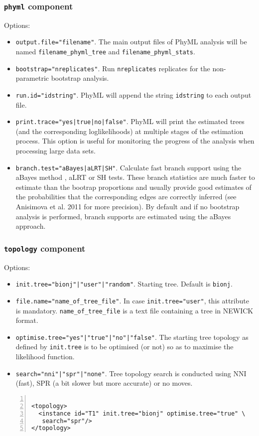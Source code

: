 \documentclass[a4paper,12pt]{article}
\newcommand{\x}[1]{\texttt{#1}}
\begin{document}
\subsubsection{{\tt phyml} component}
Options:
\begin{itemize}
\item \x{output.file="filename"}. The main output files of PhyML analysis will be named
  \x{filename\_phyml\_tree} and \x{filename\_phyml\_stats}.
\item \x{bootstrap="nreplicates"}. Run \x{nreplicates} replicates for the non-parametric bootstrap analysis.
\item \x{run.id="idstring"}. PhyML will append the string \x{idstring} to each output file.
\item \x{print.trace="yes|true|no|false"}. PhyML will print the estimated trees (and the
  corresponding loglikelihoods) at multiple stages of the estimation process. This option is useful
  for monitoring the progress of the analysis when processing large data sets.
\item \x{branch.test="aBayes|aLRT|SH"}. Calculate fast branch support using the aBayes method
  \cite{anisimova11}, aLRT \cite{anisimova06} or SH \cite{shimodaira99} tests. These branch
  statistics are much faster to estimate than the bootrap proportions and usually provide good
  estimates of the probabilities that the corresponding edges are correctly inferred (see Anisimova et
  al. 2011 for more precision). By default and if no bootstrap analysis is performed, branch supports
  are estimated using the aBayes approach.

\end{itemize}
\subsubsection{{\tt topology} component}
Options:
\begin{itemize}
\item \x{init.tree="bionj"|"user"|"random"}.  Starting tree. Default is \x{bionj}.
\item \x{file.name="name\_of\_tree\_file"}. In case \x{init.tree="user"}, this
  attribute  is mandatory. \x{name\_of\_tree\_file} is a
  text file containing a tree in NEWICK format. 
\item \x{optimise.tree="yes"|"true"|"no"|"false"}. The starting tree topology as defined by
  \x{init.tree} is to be optimised (or not) so as to maximise the likelihood function.
\item \x{search="nni"|"spr"|"none"}. Tree topology search is conducted using NNI (fast), SPR (a bit
  slower but more accurate) or no moves.
\end{itemize}
\vspace{0.2cm}
\begin{Verbatim}[frame=single, label=Example of `topology' component, samepage=true,
  baselinestretch=0.5, fontsize=\small, numbers=left]

<topology>
  <instance id="T1" init.tree="bionj" optimise.tree="true" \
   search="spr"/>
</topology>

\end{Verbatim}
\end{document}
